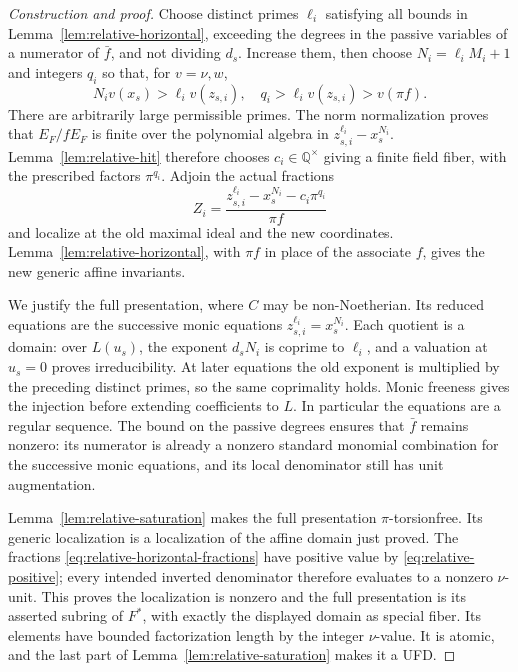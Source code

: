 \documentclass[11pt,reqno]{amsart}
\numberwithin{equation}{section}
\theoremstyle{plain}
\theoremstyle{definition}
\theoremstyle{remark}
\begin{document}
\begin{proof}[Construction and proof]
Choose distinct primes \(\ell_i\) satisfying all bounds in
Lemma~\ref{lem:relative-horizontal}, exceeding the degrees in the
passive variables of a numerator of \(\bar f\), and not dividing
\(d_s\).  Increase them, then choose \(N_i=\ell_iM_i+1\)
and integers \(q_i\) so that, for \(v=\nu,w\),
\begin{equation}\label{eq:relative-positive}
N_iv(x_s)>\ell_i v(z_{s,i}),\quad
 q_i>\ell_i v(z_{s,i})>v(\pi f).
\end{equation}
There are arbitrarily large permissible primes.  The norm
normalization proves that \(E_F/fE_F\) is finite over the
polynomial algebra in \(z_{s,i}^{\ell_i}-x_s^{N_i}\).
Lemma~\ref{lem:relative-hit} therefore chooses
\(c_i\in\mathbb Q^\times\) giving a finite field fiber, with
the prescribed factors \(\pi^{q_i}\).  Adjoin the actual fractions
\begin{equation}\label{eq:relative-horizontal-fractions}
Z_i=\frac{z_{s,i}^{\ell_i}-x_s^{N_i}-c_i\pi^{q_i}}{\pi f}
\end{equation}
and localize at the old maximal ideal and the new coordinates.
Lemma~\ref{lem:relative-horizontal}, with \(\pi f\) in place
of the associate \(f\), gives the new generic affine invariants.

We justify the full presentation, where \(C\) may be
non-Noetherian.  Its reduced equations are the successive monic
equations \(z_{s,i}^{\ell_i}=x_s^{N_i}\).  Each quotient is a
domain: over \(L(u_s)\), the exponent \(d_sN_i\) is coprime
to \(\ell_i\), and a valuation at \(u_s=0\) proves
irreducibility.  At later equations the old exponent is multiplied
by the preceding distinct primes, so the same coprimality holds.
Monic freeness gives the injection before extending coefficients
to \(L\).  In particular the equations are a regular sequence.
The bound on the passive degrees ensures that \(\bar f\) remains
nonzero: its numerator is already a nonzero standard monomial
combination for the successive monic equations, and its local
denominator still has unit augmentation.

Lemma~\ref{lem:relative-saturation} makes the full presentation
\(\pi\)-torsionfree.  Its generic localization is a localization
of the affine domain just proved.  The fractions
\eqref{eq:relative-horizontal-fractions} have positive value by
\eqref{eq:relative-positive}; every intended inverted denominator
therefore evaluates to a nonzero \(\nu\)-unit.  This proves the
localization is nonzero and the full presentation is its asserted
subring of \(F^*\), with exactly the displayed domain as special
fiber.  Its elements have bounded factorization length by the
integer \(\nu\)-value.  It is atomic, and the last part of
Lemma~\ref{lem:relative-saturation} makes it a UFD.


\end{proof}
\end{document}
